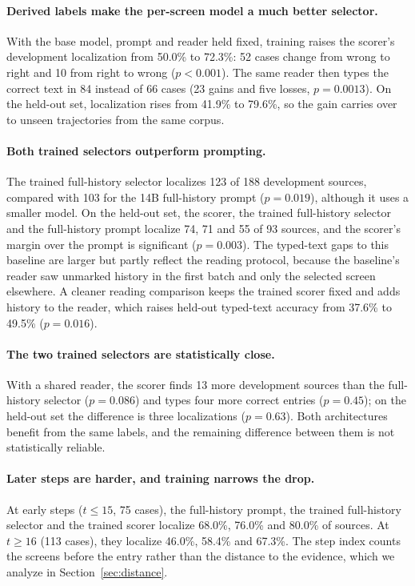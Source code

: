 \paragraph{Derived labels make the per-screen model a much better selector.} With the base model, prompt and reader held fixed, training raises the scorer's development localization from 50.0\% to 72.3\%: 52 cases change from wrong to right and 10 from right to wrong ($p<0.001$). The same reader then types the correct text in 84 instead of 66 cases (23 gains and five losses, $p=0.0013$). On the held-out set, localization rises from 41.9\% to 79.6\%, so the gain carries over to unseen trajectories from the same corpus.

\paragraph{Both trained selectors outperform prompting.} The trained full-history selector localizes 123 of 188 development sources, compared with 103 for the 14B full-history prompt ($p=0.019$), although it uses a smaller model. On the held-out set, the scorer, the trained full-history selector and the full-history prompt localize 74, 71 and 55 of 93 sources, and the scorer's margin over the prompt is significant ($p=0.003$). The typed-text gaps to this baseline are larger but partly reflect the reading protocol, because the baseline's reader saw unmarked history in the first batch and only the selected screen elsewhere. A cleaner reading comparison keeps the trained scorer fixed and adds history to the reader, which raises held-out typed-text accuracy from 37.6\% to 49.5\% ($p=0.016$).

\paragraph{The two trained selectors are statistically close.} With a shared reader, the scorer finds 13 more development sources than the full-history selector ($p=0.086$) and types four more correct entries ($p=0.45$); on the held-out set the difference is three localizations ($p=0.63$). Both architectures benefit from the same labels, and the remaining difference between them is not statistically reliable.

\paragraph{Later steps are harder, and training narrows the drop.} At early steps ($t\leq15$, 75 cases), the full-history prompt, the trained full-history selector and the trained scorer localize 68.0\%, 76.0\% and 80.0\% of sources. At $t\geq16$ (113 cases), they localize 46.0\%, 58.4\% and 67.3\%. The step index counts the screens before the entry rather than the distance to the evidence, which we analyze in Section~\ref{sec:distance}.

